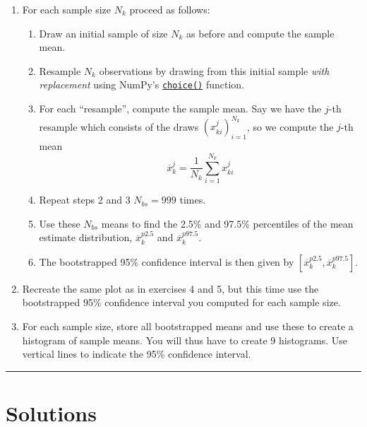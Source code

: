 \documentclass[10pt]{scrartcl}
\providecommand{\tightlist}{%
      \setlength{\itemsep}{0pt}\setlength{\parskip}{0pt}}
\begin{document}
\begin{enumerate}
\def\labelenumi{\arabic{enumi}.}
\tightlist
\item
  For each sample size \(N_k\) proceed as follows:

  \begin{enumerate}
  \def\labelenumii{\arabic{enumii}.}
  \tightlist
  \item
    Draw an initial sample of size \(N_k\) as before and compute the
    sample mean.
  \item
    Resample \(N_k\) observations by drawing from this initial sample
    \emph{with}\\
    \emph{replacement} using NumPy's
    \href{https://numpy.org/doc/stable/reference/random/generated/numpy.random.Generator.choice.html}{\texttt{choice()}}
    function.
  \item
    For each ``resample'', compute the sample mean. Say we have the
    \(j\)-th resample which consists of the draws
    \((x_{ki}^j)_{i=1}^{N_k}\), so we compute the \(j\)-th mean \[
    \overline{x}_{k}^j = \frac{1}{N_k} \sum_{i=1}^{N_k} x_{ki}^j
    \]
  \item
    Repeat steps 2 and 3 \(N_{bs} = 999\) times.
  \item
    Use these \(N_{bs}\) means to find the 2.5\% and 97.5\% percentiles
    of the mean estimate distribution, \(\overline{x}_k^{p2.5}\) and
    \(\overline{x}_k^{p97.5}\).
  \item
    The bootstrapped 95\% confidence interval is then given by
    \(\left[\overline{x}_k^{p2.5}, \overline{x}_k^{p97.5}\right]\).
  \end{enumerate}
\item
  Recreate the same plot as in exercises 4 and 5, but this time use the
  bootstrapped 95\% confidence interval you computed for each sample
  size.
\item
  For each sample size, store all bootstrapped means and use these to
  create a histogram of sample means. You will thus have to create 9
  histograms. Use vertical lines to indicate the 95\% confidence
  interval.
\end{enumerate}

    \begin{center}\rule{0.5\linewidth}{0.5pt}\end{center}

\hypertarget{solutions}{%
\section{Solutions}\label{solutions}}
\end{document}
